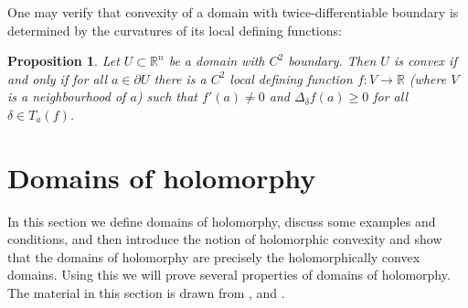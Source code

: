 \documentclass[11pt,a4paper, final, twoside]{article}
\newtheorem{proposition}[theorem]{Proposition}
\numberwithin{equation}{section}
\newcommand{\R}{\mathbb R}
\newcommand{\bd}{\partial}
\newcommand{\cts}{C}
\begin{document}
One may verify that convexity of a domain with twice-differentiable boundary is determined by the curvatures of its local defining functions:
\begin{proposition}
\label{blakeyy}
Let $U\subset\R^n$ be a domain with $\cts^2$ boundary. Then $U$ is convex if and only if for all $a\in\bd U$ there is a $\cts^2$ local defining function $f\colon V\to\R$ (where $V$ is a neighbourhood of $a$)
such that $f'(a)\neq 0$ and $\Delta_\delta f(a)\geq 0$ for all $\delta\in T_a(f)$. 
\end{proposition}



\section{Domains of holomorphy}
\label{chap:hol}
In this section we define domains of holomorphy, discuss some examples and conditions, and then introduce the notion of
holomorphic convexity and show that the domains of holomorphy are precisely the holomorphically convex domains. Using this we will prove several properties of domains of holomorphy. The material
in this section is drawn from
\cite{krantz}, \cite{range} and \cite{itca}.
\end{document}
